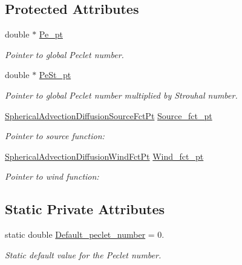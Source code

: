 \subsection*{Protected Attributes}
\begin{DoxyCompactItemize}
\item 
double $\ast$ \hyperlink{classoomph_1_1SphericalAdvectionDiffusionEquations_ab650e6ff8db720b2c7d061f885f1c628}{Pe\+\_\+pt}
\begin{DoxyCompactList}\small\item\em Pointer to global Peclet number. \end{DoxyCompactList}\item 
double $\ast$ \hyperlink{classoomph_1_1SphericalAdvectionDiffusionEquations_a3fdb5e8765ae60ea6c218629e2cb207c}{Pe\+St\+\_\+pt}
\begin{DoxyCompactList}\small\item\em Pointer to global Peclet number multiplied by Strouhal number. \end{DoxyCompactList}\item 
\hyperlink{classoomph_1_1SphericalAdvectionDiffusionEquations_aa02d787c43f88e46ad5e21c7b299b5cb}{Spherical\+Advection\+Diffusion\+Source\+Fct\+Pt} \hyperlink{classoomph_1_1SphericalAdvectionDiffusionEquations_a588bb8fcf23cd8bc38225f974d4cde7e}{Source\+\_\+fct\+\_\+pt}
\begin{DoxyCompactList}\small\item\em Pointer to source function\+: \end{DoxyCompactList}\item 
\hyperlink{classoomph_1_1SphericalAdvectionDiffusionEquations_adef9c036e9f80c134078d8d78049199e}{Spherical\+Advection\+Diffusion\+Wind\+Fct\+Pt} \hyperlink{classoomph_1_1SphericalAdvectionDiffusionEquations_a6a8673efdb4df145804fbb92dccd1835}{Wind\+\_\+fct\+\_\+pt}
\begin{DoxyCompactList}\small\item\em Pointer to wind function\+: \end{DoxyCompactList}\end{DoxyCompactItemize}
\subsection*{Static Private Attributes}
\begin{DoxyCompactItemize}
\item 
static double \hyperlink{classoomph_1_1SphericalAdvectionDiffusionEquations_ab28f6e9b6c44a405e7ee7611df43e7c7}{Default\+\_\+peclet\+\_\+number} = 0.
\begin{DoxyCompactList}\small\item\em Static default value for the Peclet number. \end{DoxyCompactList}\end{DoxyCompactItemize}
